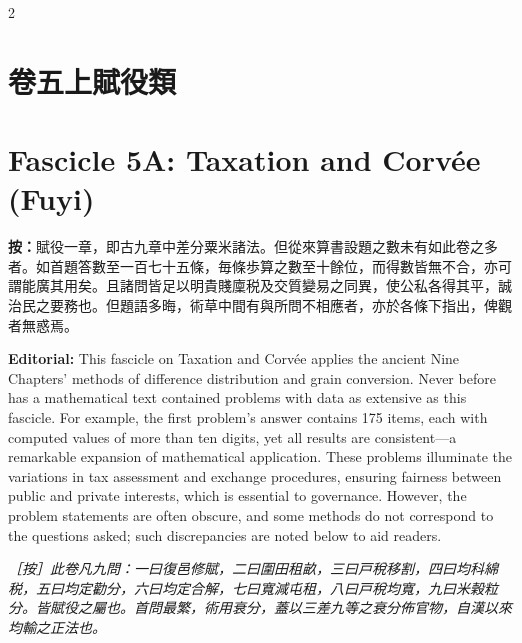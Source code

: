\documentclass[11pt,a4paper]{article}
\newcommand{\EdNoteText}[1]{\par\noindent\textit{\color{ednotecolor}［按］#1}\par}
\begin{document}
\newpage
\tableofcontents
\newpage


\newpage
\begin{paracol}{2}

\section*{\color{titlecolor}卷五上\quad 賦役類}

\switchcolumn

\section*{\color{titlecolor}Fascicle 5A: Taxation and Corv\'{e}e (Fuyi)}

\switchcolumn*

\noindent\textbf{按：}賦役一章，即古九章中差分粟米諸法。但從來算書設題之數未有如此卷之多者。如首題答數至一百七十五條，毎條歩算之數至十餘位，而得數皆無不合，亦可謂能廣其用矣。且諸問皆足以明貴賤廩税及交質變易之同異，使公私各得其平，誠治民之要務也。但題語多晦，術草中間有與所問不相應者，亦於各條下指出，俾觀者無惑焉。

\switchcolumn

\noindent\textbf{Editorial:} This fascicle on Taxation and Corv\'{e}e applies the ancient Nine Chapters' methods of difference distribution and grain conversion. Never before has a mathematical text contained problems with data as extensive as this fascicle. For example, the first problem's answer contains 175 items, each with computed values of more than ten digits, yet all results are consistent---a remarkable expansion of mathematical application. These problems illuminate the variations in tax assessment and exchange procedures, ensuring fairness between public and private interests, which is essential to governance. However, the problem statements are often obscure, and some methods do not correspond to the questions asked; such discrepancies are noted below to aid readers.

\switchcolumn*

\EdNoteText{此卷凡九問：一曰復邑修賦，二曰圍田租畝，三曰戸稅移割，四曰均科綿税，五曰均定勸分，六曰均定合解，七曰寬減屯租，八曰戸稅均寬，九曰米榖粒分。皆賦役之屬也。首問最繁，術用衰分，蓋以三差九等之衰分佈官物，自漢以來均輸之正法也。}


\end{paracol}
\end{document}

